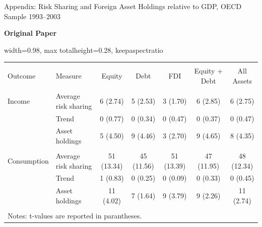 \documentclass[aspectratio=169, 10pt]{beamer}
\begin{document}
\begin{frame}[t]{Appendix: Risk Sharing and Foreign Asset Holdings relative to GDP, OECD Sample 1993--2003}
  \centering
  
  \begingroup
  \tiny
  \setlength{\tabcolsep}{1pt}
  \renewcommand{\arraystretch}{0.62}
  
  \vspace{0.03cm}
  
  {\scriptsize \textbf{Original Paper}}
  
  \vspace{0.04cm}
  
  \begin{adjustbox}{
    width=0.98\textwidth,
    max totalheight=0.28\textheight,
    keepaspectratio
  }
  \begin{tabular}{@{\extracolsep{3pt}}llccccc}
  \\[-1.8ex]\hline
  \hline \\[-1.8ex]
  Outcome 
  & Measure
  & Equity 
  & Debt 
  & FDI 
  & Equity + Debt 
  & All Assets \\
  \hline \\[-1.8ex]
  
  Income
  & Average risk sharing 
  & 6 (2.74)
  & 5 (2.53)
  & 3 (1.70)
  & 6 (2.85)
  & 6 (2.75) \\
  
  & Trend 
  & 0 (0.77)
  & 0 (0.34)
  & 0 (0.47)
  & 0 (0.37)
  & 0 (0.47) \\
  
  & Asset holdings 
  & 5 (4.50)
  & 9 (4.46)
  & 3 (2.70)
  & 9 (4.65)
  & 8 (4.35) \\
  
  \hline \\[-1.8ex]
  
  Consumption
  & Average risk sharing 
  & 51 (13.34)
  & 45 (11.56)
  & 51 (13.39)
  & 47 (11.95)
  & 48 (12.34) \\
  
  & Trend 
  & 1 (0.83)
  & 0 (0.25)
  & 0 (0.09)
  & 0 (0.33)
  & 0 (0.45) \\
  
  & Asset holdings 
  & 11 (4.02)
  & 7 (1.64)
  & 9 (3.79)
  & 9 (2.26)
  & 11 (2.74) \\
  
  \hline \\[-1.8ex]
  \multicolumn{7}{l}{\footnotesize Notes: t-values are reported in parantheses.} \\
  \end{tabular}
  \end{adjustbox}
  

\end{frame}
\end{document}
